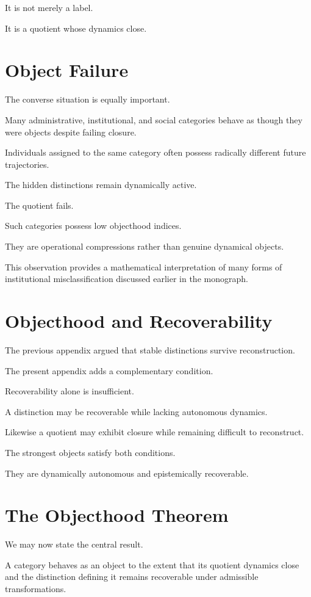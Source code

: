 \documentclass[11pt,oneside,openany]{book}
\begin{document}
It is not merely a label.

It is a quotient whose dynamics close.

\section{Object Failure}

The converse situation is equally important.

Many administrative, institutional, and social categories behave as though they were objects despite failing closure.

Individuals assigned to the same category often possess radically different future trajectories.

The hidden distinctions remain dynamically active.

The quotient fails.

Such categories possess low objecthood indices.

They are operational compressions rather than genuine dynamical objects.

This observation provides a mathematical interpretation of many forms of institutional misclassification discussed earlier in the monograph.

\section{Objecthood and Recoverability}

The previous appendix argued that stable distinctions survive reconstruction.

The present appendix adds a complementary condition.

Recoverability alone is insufficient.

A distinction may be recoverable while lacking autonomous dynamics.

Likewise a quotient may exhibit closure while remaining difficult to reconstruct.

The strongest objects satisfy both conditions.

They are dynamically autonomous and epistemically recoverable.

\section{The Objecthood Theorem}

We may now state the central result.

\begin{theorem}

A category behaves as an object to the extent that its quotient dynamics close and the distinction defining it remains recoverable under admissible transformations.

\end{theorem}
\end{document}
